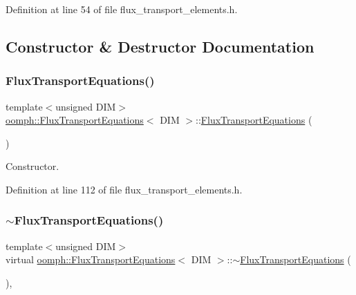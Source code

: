 Definition at line 54 of file flux\+\_\+transport\+\_\+elements.\+h.



\subsection{Constructor \& Destructor Documentation}
\mbox{\label{classoomph_1_1FluxTransportEquations_ab27ca8e2ad9c550bbeeb9a555e4f2c2d}} 
\subsubsection{\texorpdfstring{Flux\+Transport\+Equations()}{FluxTransportEquations()}}
{\footnotesize\ttfamily template$<$unsigned D\+IM$>$ \\
\hyperlink{classoomph_1_1FluxTransportEquations}{oomph\+::\+Flux\+Transport\+Equations}$<$ D\+IM $>$\+::\hyperlink{classoomph_1_1FluxTransportEquations}{Flux\+Transport\+Equations} (\begin{DoxyParamCaption}{ }\end{DoxyParamCaption})\hspace{0.3cm}{\ttfamily [inline]}}



Constructor. 



Definition at line 112 of file flux\+\_\+transport\+\_\+elements.\+h.

\mbox{\label{classoomph_1_1FluxTransportEquations_acb0c1a839416f66fddf50b0fc55fc3f8}} 
\subsubsection{\texorpdfstring{$\sim$\+Flux\+Transport\+Equations()}{~FluxTransportEquations()}}
{\footnotesize\ttfamily template$<$unsigned D\+IM$>$ \\
virtual \hyperlink{classoomph_1_1FluxTransportEquations}{oomph\+::\+Flux\+Transport\+Equations}$<$ D\+IM $>$\+::$\sim$\hyperlink{classoomph_1_1FluxTransportEquations}{Flux\+Transport\+Equations} (\begin{DoxyParamCaption}{ }\end{DoxyParamCaption})\hspace{0.3cm}{\ttfamily [inline]}, {\ttfamily [virtual]}}



